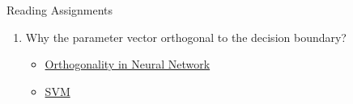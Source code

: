 \documentclass[9pt,dvipsnames]{beamer}
\begin{document}
\begin{frame}{Reading Assignments}
	\begin{enumerate}
		\item Why the parameter vector orthogonal to the decision boundary?
		\begin{itemize}
			\item \href{https://stackoverflow.com/questions/10177330/why-is-weight-vector-orthogonal-to-decision-plane-in-neural-networks/10357067}{Orthogonality in Neural Network}
			\item 			\href{https://datascience.stackexchange.com/questions/6054/in-svm-algorithm-why-vector-w-is-orthogonal-to-the-separating-hyperplane}{SVM}
		\end{itemize}
	\end{enumerate}
\end{frame}
\end{document}
